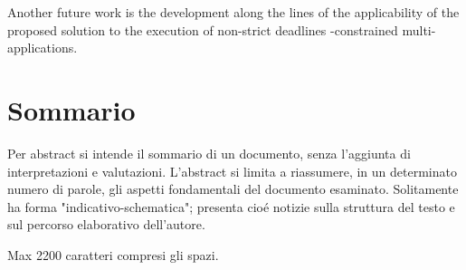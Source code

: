 Another future work is the development along the lines of the applicability of the proposed solution to the execution of non-strict deadlines \qos-constrained multi-\plans applications.

\vfill
\newpage
{}
\chapter*{Sommario}
Per abstract si intende il sommario di un documento, senza l'aggiunta di interpretazioni e valutazioni. L'abstract si limita a riassumere, in un determinato numero di parole, gli aspetti fondamentali del documento esaminato. Solitamente ha forma "indicativo-schematica"; presenta cioé notizie sulla struttura del testo e sul percorso elaborativo dell'autore.

Max 2200 caratteri compresi gli spazi.

\endgroup